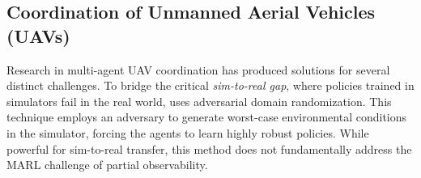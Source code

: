 
\subsection{Coordination of Unmanned Aerial Vehicles (UAVs)}
Research in multi-agent UAV coordination has produced solutions for several distinct challenges. To bridge the critical \textit{sim-to-real gap}, where policies trained in simulators fail in the real world, \parencite{adversarial_domain_randomization} uses adversarial domain randomization. This technique employs an adversary to generate worst-case environmental conditions in the simulator, forcing the agents to learn highly robust policies. While powerful for sim-to-real transfer, this method does not fundamentally address the MARL challenge of partial observability.


